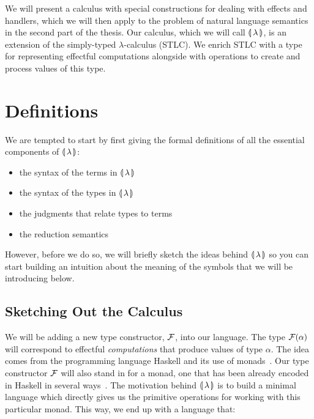 We will present a calculus with special constructions for dealing with
effects and handlers, which we will then apply to the problem of natural
language semantics in the second part of the thesis. Our calculus, which we
will call ${\llparenthesis \, \lambda \, \rrparenthesis}$, is an extension of the simply-typed $\lambda$-calculus
(STLC). We enrich STLC with a type for representing effectful computations
alongside with operations to create and process values of this type.

\EmptyNewPage


\chapter{Definitions}
\label{chap:definitions}

We are tempted to start by first giving the formal definitions of all the
essential components of ${\llparenthesis \, \lambda \, \rrparenthesis}$:

\begin{itemize}
\item the syntax of the terms in ${\llparenthesis \, \lambda \, \rrparenthesis}$ 
\item the syntax of the types in ${\llparenthesis \, \lambda \, \rrparenthesis}$
\item the judgments that relate types to terms
\item the reduction semantics
\end{itemize}

However, before we do so, we will briefly sketch the ideas behind ${\llparenthesis \, \lambda \, \rrparenthesis}$
so you can start building an intuition about the meaning of the symbols
that we will be introducing below.

\minitoc


\section{Sketching Out the Calculus}

We will be adding a new type constructor, $\mathcal{F}$, into our language. The
type $\mathcal{F}(\alpha)$ will correspond to effectful \emph{computations} that
produce values of type $\alpha$. The idea comes from the programming
language Haskell and its use of
monads~\cite{moggi1991notions,wadler1992essence,jones2003haskell}. Our type
constructor $\mathcal{F}$ will also stand in for a monad, one that has been already
encoded in Haskell in several
ways~\cite{kiselyov2013extensible,kammar2013handlers}. The motivation
behind ${\llparenthesis \, \lambda \, \rrparenthesis}$ is to build a minimal language which directly gives us the
primitive operations for working with this particular monad. This way, we
end up with a language that:

